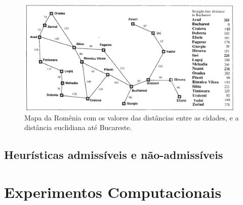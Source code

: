 \begin{figure}[H]
\centering
\includegraphics[width=.90\textwidth]{figuras/Aestrela-mapa1} 
\caption{Mapa da Romênia com os valores das distâncias entre as cidades, e a distância euclidiana até Bucareste.}
\label{fig-aestrela-algoritmo-mapa1}
\end{figure}






\subsection{Heurísticas admissíveis e não-admissíveis}
\label{sec-aestrela-algoritmo-heuristica}  

\section{Experimentos Computacionais}
\label{sec-aestrela-experimentos}
